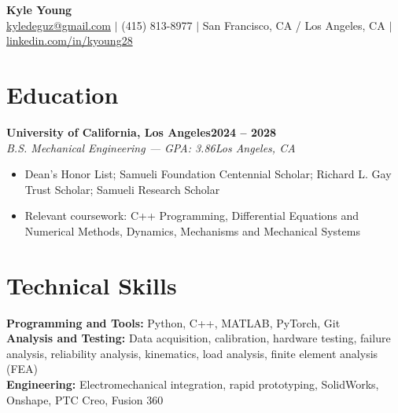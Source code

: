 \documentclass[10pt,letterpaper]{article}
\newcommand{\entry}[4]{%
  \textbf{#1}\hfill\textbf{#2}\\
  \textit{#3}\hfill\textit{#4}\par
}
\begin{document}
\begin{center}
  {\Huge\bfseries Kyle Young}\\[4pt]
  \small
  \href{mailto:kyledeguz@gmail.com}{kyledeguz@gmail.com} $|$
  (415) 813-8977 $|$ San Francisco, CA / Los Angeles, CA $|$
  \href{https://www.linkedin.com/in/kyoung28}{linkedin.com/in/kyoung28}
\end{center}
\vspace{-9pt}

\section{Education}
\entry{University of California, Los Angeles}{2024 -- 2028}
{B.S. Mechanical Engineering --- GPA: 3.86}{Los Angeles, CA}
\begin{itemize}
  \item Dean's Honor List; Samueli Foundation Centennial Scholar; Richard L. Gay Trust Scholar; Samueli Research Scholar
  \item Relevant coursework: C++ Programming, Differential Equations and Numerical Methods, Dynamics, Mechanisms and Mechanical Systems
\end{itemize}

\section{Technical Skills}
\textbf{Programming and Tools:} Python, C++, MATLAB, PyTorch, Git\\
\textbf{Analysis and Testing:} Data acquisition, calibration, hardware testing, failure analysis, reliability analysis, kinematics, load analysis, finite element analysis (FEA)\\
\textbf{Engineering:} Electromechanical integration, rapid prototyping, SolidWorks, Onshape, PTC Creo, Fusion 360
\end{document}

